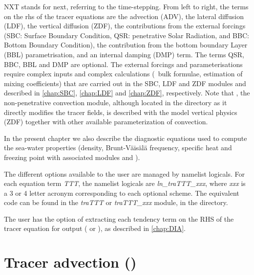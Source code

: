 \documentclass[../main/NEMO_manual]{subfiles}
\begin{document}
NXT stands for next, referring to the time-stepping.
From left to right, the terms on the rhs of the tracer equations are the advection (ADV),
the lateral diffusion (LDF), the vertical diffusion (ZDF),
the contributions from the external forcings (SBC: Surface Boundary Condition,
QSR: penetrative Solar Radiation, and BBC: Bottom Boundary Condition),
the contribution from the bottom boundary Layer (BBL) parametrisation,
and an internal damping (DMP) term.
The terms QSR, BBC, BBL and DMP are optional.
The external forcings and parameterisations require complex inputs and complex calculations
(\eg\ bulk formulae, estimation of mixing coefficients) that are carried out in the SBC,
LDF and ZDF modules and described in \autoref{chap:SBC}, \autoref{chap:LDF} and
\autoref{chap:ZDF}, respectively.
Note that , the non-penetrative convection module,
although located in the  directory as it directly modifies the tracer fields,
is described with the model vertical physics (ZDF) together with
other available parameterization of convection.

In the present chapter we also describe the diagnostic equations used to
compute the sea-water properties (density, Brunt-V\"{a}is\"{a}l\"{a} frequency, specific heat and
freezing point with associated modules  and ).

The different options available to the user are managed by namelist logicals.
For each equation term \textit{TTT}, the namelist logicals are \textit{ln\_traTTT\_xxx},
where \textit{xxx} is a 3 or 4 letter acronym corresponding to each optional scheme.
The equivalent code can be found in the \textit{traTTT} or \textit{traTTT\_xxx} module,
in the  directory.

The user has the option of extracting each tendency term on the RHS of the tracer equation for output
( or ),
as described in \autoref{chap:DIA}.

\section[Tracer advection (\textit{traadv.F90})]{Tracer advection (\protect{})}
\label{sec:TRA_adv}

\begin{listing}
  \caption{}
  \label{lst:namtra_adv}
\end{listing}
\end{document}
